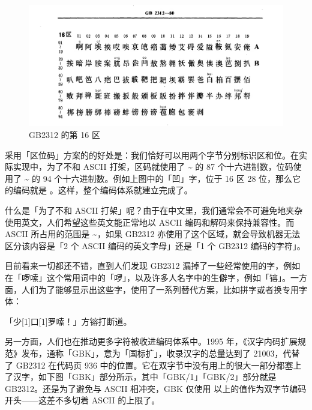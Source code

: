 \begin{figure}[htb!]
  \centering
  \includegraphics[width=.7\textwidth]{assets/advanced/GB2312.png}
  \caption{GB2312 的第 16 区}
  \label{fig:GB2312-block-16}
\end{figure}

采用「区位码」方案的的好处是：我们恰好可以用两个字节分别标识区和位。在实际实现中，为了不和 ASCII 打架，区码就使用了 \textasciitilde{} 的 87 个十六进制数，位码使用了 \textasciitilde{} 的 94 个十六进制数。例如上图中的「凹」字，位于 16 区 28 位，那么它的编码就是 。这样，整个编码体系就建立完成了。

\begin{note}
  什么是「为了不和 ASCII 打架」呢？由于在中文里，我们通常会不可避免地夹杂使用英文，人们希望这些英文能正常地以 ASCII 编码和解码来保持兼容性。而 ASCII 所占用的范围是 \textasciitilde{}，如果 GB2312 亦使用了这个区域，就会导致机器无法区分该内容是「2 个 ASCII 编码的英文字母」还是「1 个 GB2312 编码的字符」。
\end{note}

目前看来一切都还不错，直到人们发现 GB2312 漏掉了一些经常使用的字，例如在「啰嗦」这个常用词中的「啰」，以及许多人名字中的生僻字，例如「镕」。一方面，人们为了能够显示出这些字，使用了一系列替代方案，比如拼字或者换专用字体：

\begin{quoting}
  「少\scalebox{0.4}[1]{口}\scalebox{0.6}[1]{罗}嗦！」方{\SimSun 镕}打断道。
\end{quoting}

另一方面，人们也在推动更多字符被收进编码体系中。1995 年，《汉字内码扩展规范》发布，通称「GBK」，意为「国标扩」，收录汉字的总量达到了 21003，代替了 GB2312 在代码页 936 中的位置。它在双字节中没有用上的很大一部分都塞上了汉字，如下图「GBK」部分所示，其中「GBK/1」「GBK/2」部分就是 GB2312。还是为了避免与 ASCII 相冲突，GBK 仅使用  以上的值作为双字节编码开头——这差不多切着 ASCII  的上限了。

